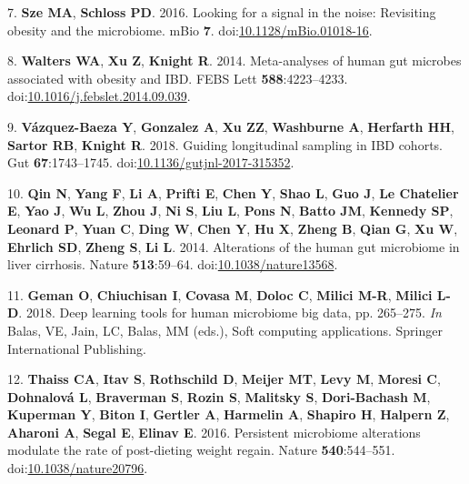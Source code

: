 \documentclass[11pt,]{article}
\begin{document}
\hypertarget{ref-sze_looking_2016}{}
7. \textbf{Sze MA}, \textbf{Schloss PD}. 2016. Looking for a signal in
the noise: Revisiting obesity and the microbiome. mBio \textbf{7}.
doi:\href{https://doi.org/10.1128/mBio.01018-16}{10.1128/mBio.01018-16}.

\hypertarget{ref-walters_meta-analyses_2014}{}
8. \textbf{Walters WA}, \textbf{Xu Z}, \textbf{Knight R}. 2014.
Meta-analyses of human gut microbes associated with obesity and IBD.
FEBS Lett \textbf{588}:4223--4233.
doi:\href{https://doi.org/10.1016/j.febslet.2014.09.039}{10.1016/j.febslet.2014.09.039}.

\hypertarget{ref-vazquez-baeza_guiding_2018}{}
9. \textbf{Vázquez-Baeza Y}, \textbf{Gonzalez A}, \textbf{Xu ZZ},
\textbf{Washburne A}, \textbf{Herfarth HH}, \textbf{Sartor RB},
\textbf{Knight R}. 2018. Guiding longitudinal sampling in IBD cohorts.
Gut \textbf{67}:1743--1745.
doi:\href{https://doi.org/10.1136/gutjnl-2017-315352}{10.1136/gutjnl-2017-315352}.

\hypertarget{ref-qin_alterations_2014}{}
10. \textbf{Qin N}, \textbf{Yang F}, \textbf{Li A}, \textbf{Prifti E},
\textbf{Chen Y}, \textbf{Shao L}, \textbf{Guo J}, \textbf{Le Chatelier
E}, \textbf{Yao J}, \textbf{Wu L}, \textbf{Zhou J}, \textbf{Ni S},
\textbf{Liu L}, \textbf{Pons N}, \textbf{Batto JM}, \textbf{Kennedy SP},
\textbf{Leonard P}, \textbf{Yuan C}, \textbf{Ding W}, \textbf{Chen Y},
\textbf{Hu X}, \textbf{Zheng B}, \textbf{Qian G}, \textbf{Xu W},
\textbf{Ehrlich SD}, \textbf{Zheng S}, \textbf{Li L}. 2014. Alterations
of the human gut microbiome in liver cirrhosis. Nature
\textbf{513}:59--64.
doi:\href{https://doi.org/10.1038/nature13568}{10.1038/nature13568}.

\hypertarget{ref-geman_deep_2018}{}
11. \textbf{Geman O}, \textbf{Chiuchisan I}, \textbf{Covasa M},
\textbf{Doloc C}, \textbf{Milici M-R}, \textbf{Milici L-D}. 2018. Deep
learning tools for human microbiome big data, pp. 265--275. \emph{In}
Balas, VE, Jain, LC, Balas, MM (eds.), Soft computing applications.
Springer International Publishing.

\hypertarget{ref-thaiss_persistent_2016}{}
12. \textbf{Thaiss CA}, \textbf{Itav S}, \textbf{Rothschild D},
\textbf{Meijer MT}, \textbf{Levy M}, \textbf{Moresi C},
\textbf{Dohnalová L}, \textbf{Braverman S}, \textbf{Rozin S},
\textbf{Malitsky S}, \textbf{Dori-Bachash M}, \textbf{Kuperman Y},
\textbf{Biton I}, \textbf{Gertler A}, \textbf{Harmelin A},
\textbf{Shapiro H}, \textbf{Halpern Z}, \textbf{Aharoni A},
\textbf{Segal E}, \textbf{Elinav E}. 2016. Persistent microbiome
alterations modulate the rate of post-dieting weight regain. Nature
\textbf{540}:544--551.
doi:\href{https://doi.org/10.1038/nature20796}{10.1038/nature20796}.
\end{document}
